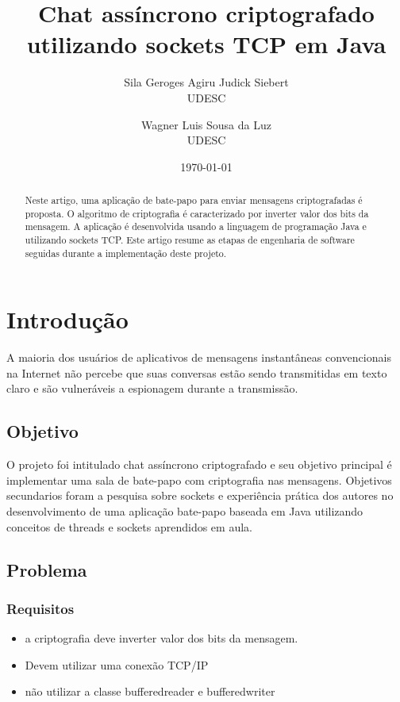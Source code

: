 \documentclass[a4paper,12pt]{article}
\title{Chat assíncrono criptografado utilizando  sockets TCP em Java}
\author{Sila Geroges Agiru Judick Siebert\\UDESC
        \and Wagner Luis Sousa da Luz \\UDESC}
\date{\today}
\begin{document}
\maketitle

\begin{abstract}
Neste artigo, uma aplicação de bate-papo para enviar mensagens  criptografadas é proposta.
O algoritmo de criptografia é caracterizado por inverter valor dos bits da mensagem. A aplicação é desenvolvida usando a linguagem de programação Java e utilizando sockets TCP. Este artigo resume as etapas de engenharia de software seguidas durante a implementação deste projeto.
\end{abstract}


\section{Introdução}
A maioria dos usuários de aplicativos de mensagens instantâneas convencionais na Internet não percebe que suas conversas estão sendo transmitidas em texto claro e são vulneráveis a espionagem durante a transmissão. 
\subsection{Objetivo}

O projeto foi intitulado  chat assíncrono criptografado e seu objetivo principal é implementar uma sala de bate-papo com criptografia nas mensagens. Objetivos secundarios foram a pesquisa sobre sockets e experiência prática dos autores no desenvolvimento de uma aplicação bate-papo baseada em Java utilizando conceitos de threads e sockets aprendidos em aula.

\subsection{Problema}
\subsubsection{Requisitos}
\begin{itemize}
\item a criptografia deve inverter valor dos bits da mensagem.
\item Devem utilizar uma conexão TCP/IP
\item não utilizar a classe bufferedreader e bufferedwriter
\end{itemize}
\end{document}
